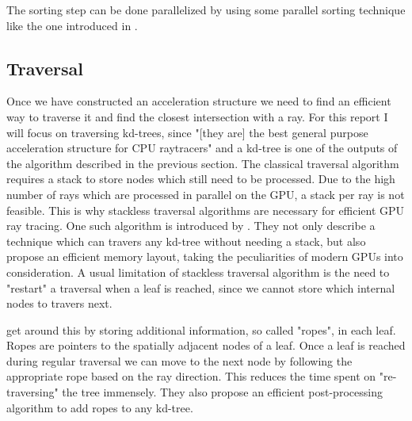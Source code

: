 \documentclass{ACGSeminar}
\begin{document}
The sorting step can be done parallelized by using some parallel sorting technique like the one introduced in \cite{Merrill:2010:RSG:1854273.1854344}.

\subsection{Traversal}
Once we have constructed an acceleration structure we need to find an efficient way to traverse it and find the closest intersection with a ray. For this report I will focus on traversing kd-trees, since "[they are] the best general purpose acceleration structure for CPU raytracers" \cite{Foley:2005} and a kd-tree is one of the outputs of the algorithm described in the previous section.
The classical traversal algorithm requires a stack to store nodes which still need to be processed. Due to the high number of rays which are processed in parallel on the GPU, a stack per ray is not feasible. This is why stackless traversal algorithms are necessary for efficient GPU ray tracing. One such algorithm is introduced by \citet{popov2007stackless}. They not only describe a technique which can travers any kd-tree without needing a stack, but also propose an efficient memory layout, taking the peculiarities of modern GPUs into consideration. A usual limitation of stackless traversal algorithm is the need to "restart" a traversal when a leaf is reached, since we cannot store which internal nodes to travers next.

\citet{popov2007stackless} get around this by storing additional information, so called "ropes", in each leaf. Ropes are pointers to the spatially adjacent nodes of a leaf. Once a leaf is reached during regular traversal we can move to the next node by following the appropriate rope based on the ray direction. This reduces the time spent on "re-traversing" the tree immensely. They also propose an efficient post-processing algorithm to add ropes to any kd-tree.
\end{document}
